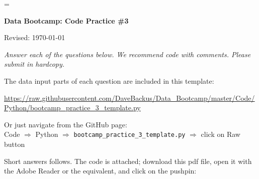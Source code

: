 \documentclass[11pt]{exam}
\begin{document}
\parskip=\bigskipamount
\parindent=0.0in
\thispagestyle{empty}


\bigskip\bigskip
\centerline{\Large \bf Data Bootcamp:  Code Practice \#3}
\centerline{Revised: \today}

{\it Answer each of the questions below.
We recommend code with comments.
Please submit in hardcopy.}

The data input parts of each question are included in this template:

\vspace{-0.06in}
{\small
\url{https://raw.githubusercontent.com/DaveBackus/Data_Bootcamp/master/Code/Python/bootcamp_practice_3_template.py}
}
\vspace{-0.06in}

Or just navigate from the GitHub page:  \\
Code $\Rightarrow$ Python $\Rightarrow$ \verb|bootcamp_practice_3_template.py| $\Rightarrow$ click on Raw button


\begin{solution}
Short answers follows.
The code is attached; download this pdf file,
open it with the Adobe Reader or the equivalent,
and click on the pushpin:
\end{solution}
\end{document}
